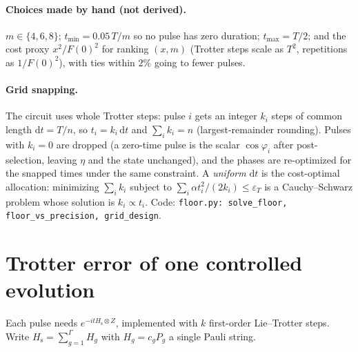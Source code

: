 \documentclass[11pt]{article}
\theoremstyle{definition}
\newcommand{\Hs}{H_{\mathrm s}}
\newcommand{\eps}{\varepsilon}
\newcommand{\code}[1]{\texttt{#1}}
\begin{document}
\paragraph{Choices made by hand (not derived).} $m\in\{4,6,8\}$; $t_{\min}=0.05\,T/m$ so no pulse has zero duration;
$t_{\max}=T/2$; and the cost proxy $x^2/F(0)^2$ for ranking $(x,m)$ (Trotter steps scale as $T^2$, repetitions as
$1/F(0)^2$), with ties within $2\%$ going to fewer pulses.

\paragraph{Grid snapping.} The circuit uses whole Trotter steps: pulse $i$ gets an integer $k_i$ steps of common length
$\mathrm dt=T/n$, so $t_i=k_i\,\mathrm dt$ and $\sum_ik_i=n$ (largest-remainder rounding). Pulses with $k_i=0$ are dropped
(a zero-time pulse is the scalar $\cos\varphi_i$ after post-selection, leaving $\eta$ and the state unchanged), and the
phases are re-optimized for the snapped times under the same constraint. A \emph{uniform} $\mathrm dt$ is the cost-optimal
allocation: minimizing $\sum_ik_i$ subject to $\sum_i\alpha t_i^2/(2k_i)\le\eps_T$ is a Cauchy--Schwarz problem whose
solution is $k_i\propto t_i$. Code: \code{floor.py: solve\_floor, floor\_vs\_precision, grid\_design}.

\section{Trotter error of one controlled evolution}\label{sec:trotter}
Each pulse needs $e^{-it\Hs\otimes Z}$, implemented with $k$ first-order Lie--Trotter steps. Write $\Hs=\sum_{g=1}^{\Gamma}H_g$
with $H_g=c_gP_g$ a single Pauli string.
\end{document}
